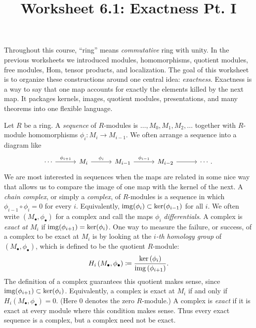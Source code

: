 \documentclass[12pt,reqno]{amsart}
\title{Worksheet 6.1: Exactness Pt. I}
\begin{document}

\maketitle
\thispagestyle{firstpageIP}

Throughout this course, ``ring'' means \textit{commutative} ring with unity. In the previous worksheets we introduced modules, homomorphisms, quotient modules, free modules, Hom, tensor products, and localization. The goal of this worksheet is to organize these constructions around one central idea: \emph{exactness}. Exactness is a way to say that one map accounts for exactly the elements killed by the next map. It packages kernels, images, quotient modules, presentations, and many theorems into one flexible language.

Let $R$ be a ring. A \emph{sequence} of $R$-modules is $\ldots,M_{0}, M_{1},M_{2},\ldots$ together with $R$-module homomorphisms $\phi_{i}:M_{i} \to M_{i-1}$. We often arrange a sequence into a diagram like\[
\begin{tikzcd}[row sep = .3em, column sep = 3em]
\cdots \arrow[r, "\phi_{i+1}"] & M_{i} \arrow[r, "\phi_{i}"] & M_{i-1} \arrow[r, "\phi_{i-1}"] & M_{i-2} \arrow[r] & \cdots.
\end{tikzcd}
\]
We are most interested in sequences when the maps are related in some nice way that allows us to compare the image of one map with the kernel of the next. A \emph{chain complex}, or simply a \emph{complex}, of $R$-modules is a sequence in which $\phi_{i-1}\circ \phi_{i}=0$ for every $i$. Equivalently, $\operatorname{img}(\phi_{i})\subset \ker(\phi_{i-1})$ for all $i$. We often write $(M_\bullet,\phi_\bullet)$ for a complex and call the maps $\phi_i$ \emph{differentials}. A complex is \emph{exact at $M_i$} if $\operatorname{img}(\phi_{i+1})=\ker(\phi_{i})$. One way to measure the failure, or success, of a complex to be exact at $M_{i}$ is by looking at the \emph{$i$-th homology group} of $(M_{\bullet},\phi_{\bullet})$, which is defined to be the quotient $R$-module:
\[
H_{i}\left(M_{\bullet}, \phi_{\bullet}\right) \coloneqq \frac{ \ker\left(\phi_{i}\right)}{\operatorname{img}\left(\phi_{i+1}\right)}.
\]
The definition of a complex guarantees this quotient makes sense, since $\operatorname{img}(\phi_{i+1}) \subset \ker(\phi_{i})$. Equivalently, a complex is exact at $M_i$ if and only if $H_i(M_\bullet,\phi_\bullet)=0$. (Here $0$ denotes the zero $R$-module.) A complex is \emph{exact} if it is exact at every module where this condition makes sense. Thus every exact sequence is a complex, but a complex need not be exact. 
\end{document}
